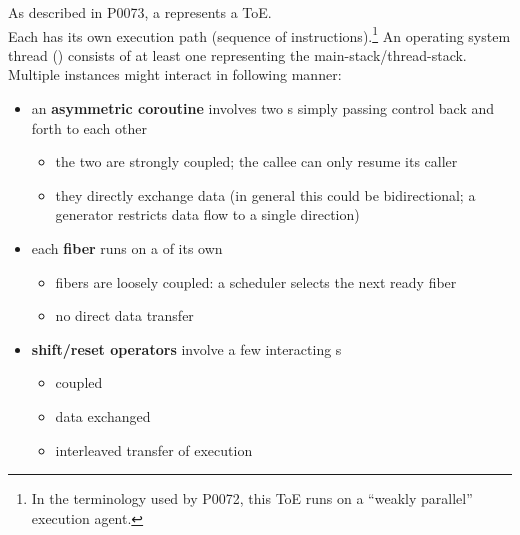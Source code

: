 \label{appendixb}
As described in P0073\cite{P0073}, a \ectx represents a ToE.\\
Each \ectx has its own execution path (sequence of instructions).\footnote{In
the terminology used by P0072\cite{P0072}, this ToE runs on a
``weakly parallel'' execution agent.} An operating system thread
() consists of at least one \ectx representing the
main-stack/thread-stack.\\
Multiple \ectx instances might interact in following manner:
\begin{itemize}
\item an {\bfseries asymmetric coroutine} involves two \ectx s simply passing
      control back and forth to each other
    \begin{itemize}
        \item the two are strongly coupled; the callee \ectx can only resume
            its caller
        \item they directly exchange data (in general this could be
            bidirectional; a generator restricts data flow to a single
            direction)
    \end{itemize}
\item each {\bfseries fiber} runs on a \ectx of its own
    \begin{itemize}
        \item fibers are loosely coupled: a scheduler selects the next ready fiber
        \item no direct data transfer
    \end{itemize}
\item {\bfseries shift/reset operators} involve a few interacting \ectx s
    \begin{itemize}
        \item coupled
        \item data exchanged
        \item interleaved transfer of execution
    \end{itemize}
\end{itemize}

